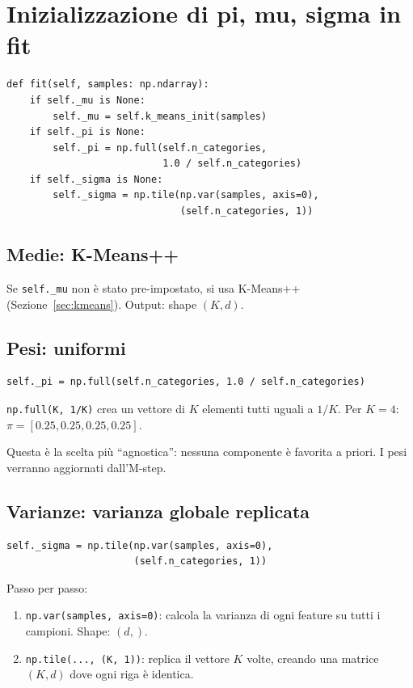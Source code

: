 \documentclass[11pt,a4paper]{article}
\begin{document}
\section{Inizializzazione di pi, mu, sigma in fit}\label{sec:init}

\begin{lstlisting}[caption={Inizializzazione dei parametri nel metodo fit}]
def fit(self, samples: np.ndarray):
    if self._mu is None:
        self._mu = self.k_means_init(samples)
    if self._pi is None:
        self._pi = np.full(self.n_categories,
                           1.0 / self.n_categories)
    if self._sigma is None:
        self._sigma = np.tile(np.var(samples, axis=0),
                              (self.n_categories, 1))
\end{lstlisting}

\subsection{Medie: K-Means++}
Se \texttt{self.\_mu} non è stato pre-impostato, si usa K-Means++
(Sezione~\ref{sec:kmeans}). Output: shape $(K, d)$.

\subsection{Pesi: uniformi}
\begin{lstlisting}
self._pi = np.full(self.n_categories, 1.0 / self.n_categories)
\end{lstlisting}

\texttt{np.full(K, 1/K)} crea un vettore di $K$ elementi tutti uguali
a $1/K$. Per $K=4$: $\pi = [0.25, 0.25, 0.25, 0.25]$.

Questa è la scelta più ``agnostica'': nessuna componente è favorita
a priori. I pesi verranno aggiornati dall'M-step.

\subsection{Varianze: varianza globale replicata}
\begin{lstlisting}
self._sigma = np.tile(np.var(samples, axis=0),
                      (self.n_categories, 1))
\end{lstlisting}

Passo per passo:
\begin{enumerate}[nosep]
  \item \texttt{np.var(samples, axis=0)}: calcola la varianza di ogni
        feature su tutti i campioni. Shape: $(d,)$.
  \item \texttt{np.tile(..., (K, 1))}: replica il vettore $K$ volte,
        creando una matrice $(K, d)$ dove ogni riga è identica.
\end{enumerate}
\end{document}

